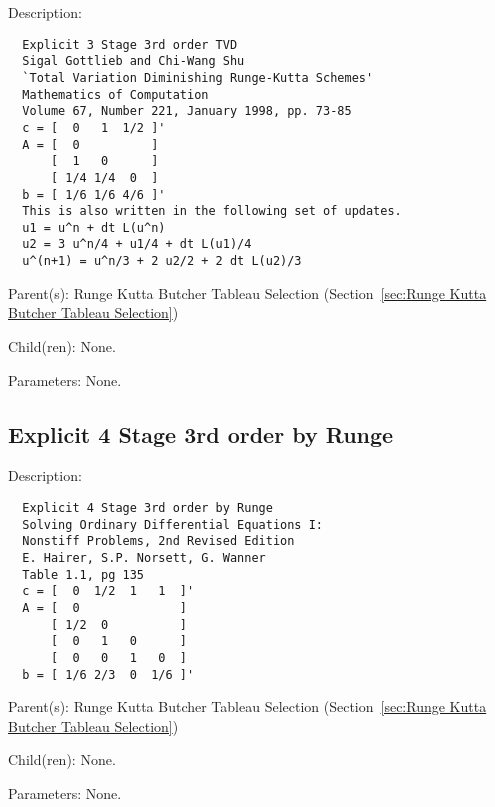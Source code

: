 \begin{list}{}
  {\setlength{\leftmargin}{1.0in}
   \setlength{\labelwidth}{0.75in}
   \setlength{\labelsep}{0.125in}}
  \item[Description:]
\begin{verbatim}
  Explicit 3 Stage 3rd order TVD
  Sigal Gottlieb and Chi-Wang Shu
  `Total Variation Diminishing Runge-Kutta Schemes'
  Mathematics of Computation
  Volume 67, Number 221, January 1998, pp. 73-85
  c = [  0   1  1/2 ]'
  A = [  0          ]
      [  1   0      ]
      [ 1/4 1/4  0  ]
  b = [ 1/6 1/6 4/6 ]'
  This is also written in the following set of updates.
  u1 = u^n + dt L(u^n)
  u2 = 3 u^n/4 + u1/4 + dt L(u1)/4
  u^(n+1) = u^n/3 + 2 u2/2 + 2 dt L(u2)/3
\end{verbatim}
  \item[Parent(s):]
    Runge Kutta Butcher Tableau Selection (Section~\ref{sec:Runge Kutta Butcher Tableau Selection})
  \item[Child(ren):]
    None. 
  \item[Parameters:]
    None. 
\end{list}

\subsection{Explicit 4 Stage 3rd order by Runge}
\label{sec:Explicit 4 Stage 3rd order by Runge}

\begin{list}{}
  {\setlength{\leftmargin}{1.0in}
   \setlength{\labelwidth}{0.75in}
   \setlength{\labelsep}{0.125in}}
  \item[Description:]
\begin{verbatim}
  Explicit 4 Stage 3rd order by Runge
  Solving Ordinary Differential Equations I:
  Nonstiff Problems, 2nd Revised Edition
  E. Hairer, S.P. Norsett, G. Wanner
  Table 1.1, pg 135
  c = [  0  1/2  1   1  ]'
  A = [  0              ]
      [ 1/2  0          ]
      [  0   1   0      ]
      [  0   0   1   0  ]
  b = [ 1/6 2/3  0  1/6 ]'
\end{verbatim}
  \item[Parent(s):]
    Runge Kutta Butcher Tableau Selection (Section~\ref{sec:Runge Kutta Butcher Tableau Selection})
  \item[Child(ren):]
    None. 
  \item[Parameters:]
    None. 
\end{list}

